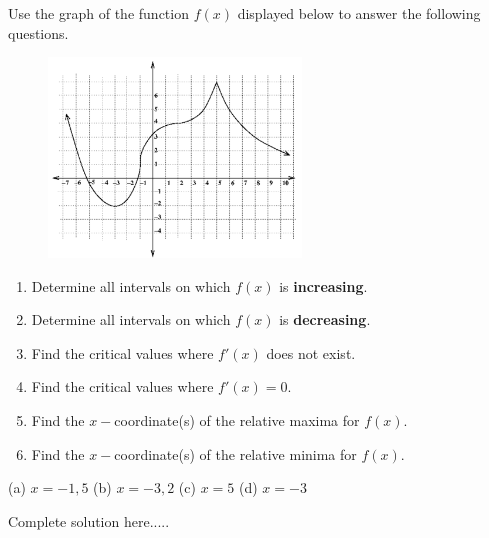\begin{example}
Use the graph of the function $f(x)$ displayed below to answer the following questions.
\begin{figure}[h]
    \centering
    \includegraphics[width=0.6\textwidth]{images/optimization/exampleGraph1.png}
    \label{fig:my_label}
\end{figure}
\renewcommand{\labelenumi}{(\alph{enumi})}
\begin{enumerate}[leftmargin=*]
    \item Determine all intervals on which $f(x)$ is \textbf{increasing}.
    \item Determine all intervals on which $f(x)$ is \textbf{decreasing}.
    \item Find the critical values where $f'(x)$ does not exist.
    \item Find the critical values where $f'(x)=0$.
    \item Find the $x-$coordinate(s) of the relative maxima for $f(x)$. 
    \item Find the $x-$coordinate(s) of the relative minima for $f(x)$. 
\end{enumerate}
    \begin{sol}
    (a) $x=-1,5$ (b) $x=-3,2$ (c) $x=5$ (d) $x=-3$
    \end{sol}
    \begin{solL}
    Complete solution here.....
    
    \end{solL}
    
\end{example}

